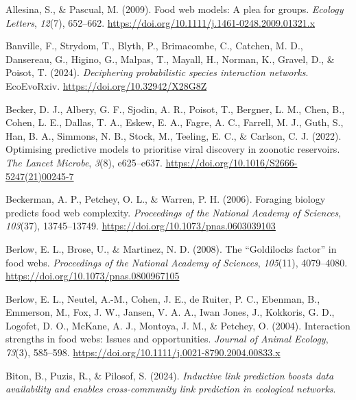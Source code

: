\documentclass[
]{article}
\newlength{\cslhangindent}
\newenvironment{CSLReferences}[2] %
 {\begin{list}{}{%
  \setlength{\itemindent}{0pt}
  \setlength{\leftmargin}{0pt}
  \setlength{\parsep}{0pt}
  \ifodd #1
   \setlength{\leftmargin}{\cslhangindent}
   \setlength{\itemindent}{-1\cslhangindent}
  \fi
  \setlength{\itemsep}{#2\baselineskip}}}
 {\end{list}}
\begin{document}
\label{refs}
\begin{CSLReferences}{1}{0}
Allesina, S., \& Pascual, M. (2009). Food web models: A plea for groups.
\emph{Ecology Letters}, \emph{12}(7), 652--662.
\url{https://doi.org/10.1111/j.1461-0248.2009.01321.x}

Banville, F., Strydom, T., Blyth, P., Brimacombe, C., Catchen, M. D.,
Dansereau, G., Higino, G., Malpas, T., Mayall, H., Norman, K., Gravel,
D., \& Poisot, T. (2024). \emph{Deciphering probabilistic species
interaction networks}. EcoEvoRxiv. \url{https://doi.org/10.32942/X28G8Z}

Becker, D. J., Albery, G. F., Sjodin, A. R., Poisot, T., Bergner, L. M.,
Chen, B., Cohen, L. E., Dallas, T. A., Eskew, E. A., Fagre, A. C.,
Farrell, M. J., Guth, S., Han, B. A., Simmons, N. B., Stock, M.,
Teeling, E. C., \& Carlson, C. J. (2022). Optimising predictive models
to prioritise viral discovery in zoonotic reservoirs. \emph{The Lancet
Microbe}, \emph{3}(8), e625--e637.
\url{https://doi.org/10.1016/S2666-5247(21)00245-7}

Beckerman, A. P., Petchey, O. L., \& Warren, P. H. (2006). Foraging
biology predicts food web complexity. \emph{Proceedings of the National
Academy of Sciences}, \emph{103}(37), 13745--13749.
\url{https://doi.org/10.1073/pnas.0603039103}

Berlow, E. L., Brose, U., \& Martinez, N. D. (2008). The {``{Goldilocks}
factor''} in food webs. \emph{Proceedings of the National Academy of
Sciences}, \emph{105}(11), 4079--4080.
\url{https://doi.org/10.1073/pnas.0800967105}

Berlow, E. L., Neutel, A.-M., Cohen, J. E., de Ruiter, P. C., Ebenman,
B., Emmerson, M., Fox, J. W., Jansen, V. A. A., Iwan Jones, J.,
Kokkoris, G. D., Logofet, D. O., McKane, A. J., Montoya, J. M., \&
Petchey, O. (2004). Interaction strengths in food webs: Issues and
opportunities. \emph{Journal of Animal Ecology}, \emph{73}(3), 585--598.
\url{https://doi.org/10.1111/j.0021-8790.2004.00833.x}

Biton, B., Puzis, R., \& Pilosof, S. (2024). \emph{Inductive link
prediction boosts data availability and enables cross-community link
prediction in ecological networks}.


\end{CSLReferences}
\end{document}
